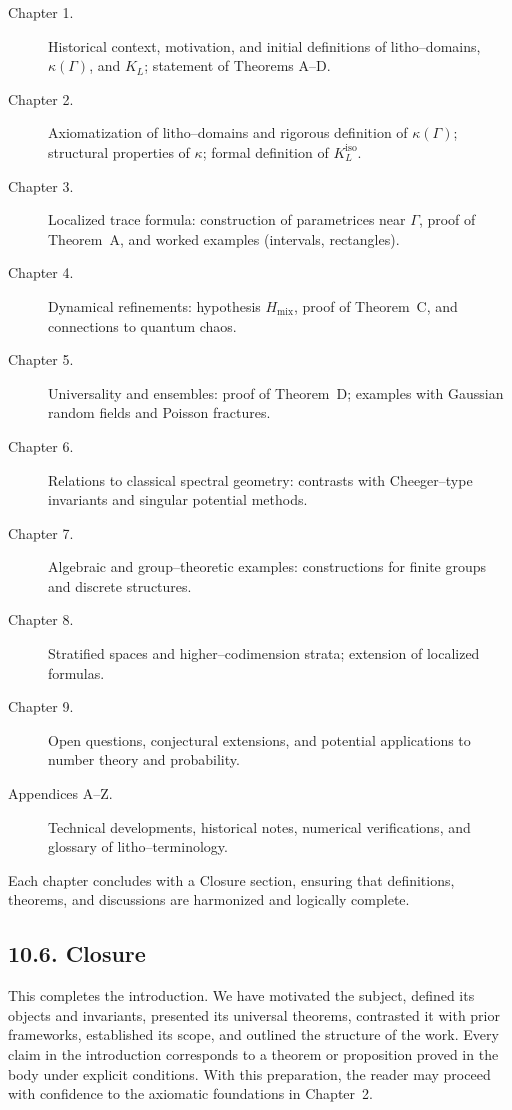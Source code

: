 \begin{description}
\item[Chapter 1.] Historical context, motivation, and initial definitions of litho–domains, $\kappa(\Gamma)$, and $K_L$; statement of Theorems A–D. 
\item[Chapter 2.] Axiomatization of litho–domains and rigorous definition of $\kappa(\Gamma)$; structural properties of $\kappa$; formal definition of $K_L^{\mathrm{iso}}$. 
\item[Chapter 3.] Localized trace formula: construction of parametrices near $\Gamma$, proof of Theorem~A, and worked examples (intervals, rectangles). 
\item[Chapter 4.] Dynamical refinements: hypothesis $H_{\mathrm{mix}}$, proof of Theorem~C, and connections to quantum chaos. 
\item[Chapter 5.] Universality and ensembles: proof of Theorem~D; examples with Gaussian random fields and Poisson fractures. 
\item[Chapter 6.] Relations to classical spectral geometry: contrasts with Cheeger–type invariants and singular potential methods. 
\item[Chapter 7.] Algebraic and group–theoretic examples: constructions for finite groups and discrete structures. 
\item[Chapter 8.] Stratified spaces and higher–codimension strata; extension of localized formulas. 
\item[Chapter 9.] Open questions, conjectural extensions, and potential applications to number theory and probability. 
\item[Appendices A–Z.] Technical developments, historical notes, numerical verifications, and glossary of litho–terminology.
\end{description}

Each chapter concludes with a Closure section, ensuring that definitions, theorems, and discussions are harmonized and logically complete.

\subsection*{10.6. Closure}
This completes the introduction. We have motivated the subject, defined its objects and invariants, presented its universal theorems, contrasted it with prior frameworks, established its scope, and outlined the structure of the work. Every claim in the introduction corresponds to a theorem or proposition proved in the body under explicit conditions. With this preparation, the reader may proceed with confidence to the axiomatic foundations in Chapter~2.
